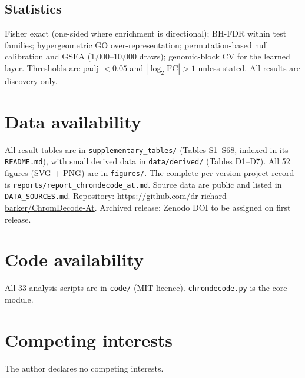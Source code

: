 \documentclass[11pt,a4paper]{article}
\begin{document}
\subsection*{Statistics}
Fisher exact (one-sided where enrichment is directional); BH-FDR within test families;
hypergeometric GO over-representation; permutation-based null calibration and GSEA
(1,000--10,000 draws); genomic-block CV for the learned layer. Thresholds are padj $<0.05$
and $|\log_2\mathrm{FC}|>1$ unless stated. All results are discovery-only.

\section*{Data availability}
All result tables are in \texttt{supplementary\_tables/} (Tables S1--S68, indexed in its
\texttt{README.md}), with small derived data in \texttt{data/derived/} (Tables D1--D7). All
52 figures (SVG + PNG) are in \texttt{figures/}. The complete per-version project record is
\texttt{reports/report\_chromdecode\_at.md}. Source data are public and listed in
\texttt{DATA\_SOURCES.md}. Repository: \url{https://github.com/dr-richard-barker/ChromDecode-At}.
Archived release: Zenodo DOI to be assigned on first release.

\section*{Code availability}
All 33 analysis scripts are in \texttt{code/} (MIT licence). \texttt{chromdecode.py} is the
core module.

\section*{Competing interests}
The author declares no competing interests.



\end{document}
